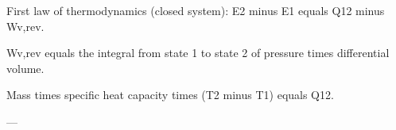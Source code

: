 First law of thermodynamics (closed system):  
E2 minus E1 equals Q12 minus Wv,rev.  

Wv,rev equals the integral from state 1 to state 2 of pressure times differential volume.  

Mass times specific heat capacity times (T2 minus T1) equals Q12.  

---